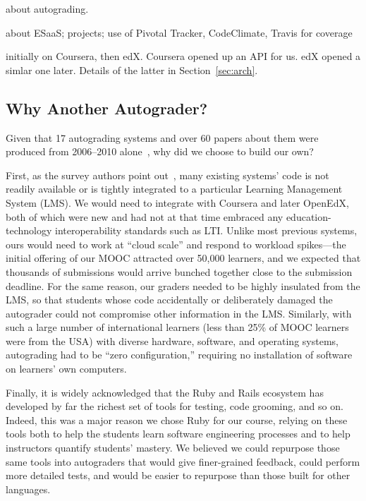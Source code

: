 about autograding.


about ESaaS; projects; use of Pivotal Tracker, CodeClimate, Travis for coverage

initially on Coursera, then edX.  Coursera opened up an API for us. edX
opened a simlar one later. Details of the latter in Section~\ref{sec:arch}.

\subsection{Why Another Autograder?}

Given that 17 autograding systems and over 60 papers about them were
produced from 2006--2010 alone~\cite{ihantola-2010-autograding-survey},
why did we choose to build our own?

First, as the survey authors point
out~\cite{ihantola-2010-autograding-survey}, many existing systems' code
is not readily available or is tightly integrated to a particular Learning
Management System (LMS).  We would need to integrate with Coursera and
later OpenEdX, both of which were new and had not at that time embraced
any education-technology interoperability standards such as
LTI.  Unlike most previous
systems, ours would need to work at ``cloud scale'' and respond to
workload spikes---the initial
offering of our MOOC attracted over 50,000 learners, and we expected
that thousands of submissions would arrive bunched together close to the
submission deadline.  For the same reason, our graders needed to be
highly insulated from the LMS, so that students whose code accidentally
or deliberately damaged the autograder could not compromise other
information in the LMS.
Similarly, with such a large number of international learners (less than
25\% of MOOC learners were from the USA) with diverse hardware,
software, and operating systems, autograding had to be ``zero
configuration,'' requiring no installation of software on learners' own computers.

Finally, it is widely acknowledged that the Ruby and Rails
ecosystem has developed by far the richest set of tools for testing,
code grooming, and so on.
Indeed, this was a major reason we chose Ruby for our course,
relying on these tools both to help the students learn software
engineering processes and to help instructors quantify students' mastery.
We believed we could repurpose those same tools into autograders that
would give finer-grained feedback, could perform more detailed tests,
and would be easier to repurpose than those built for other languages.
